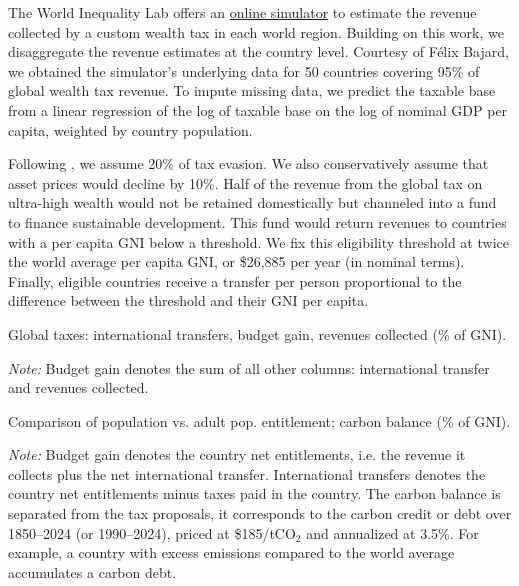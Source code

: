 \documentclass[12pt,english]{article}
\begin{document}
\begin{bibunit}
The World Inequality Lab offers an \href{https://wid.world/world-wealth-tax-simulator/}{online simulator} to estimate the revenue collected by a custom wealth tax in each world region. Building on this work, we disaggregate the revenue estimates at the country level. Courtesy of Félix Bajard, we obtained the simulator's underlying data for 50 countries covering 95\% of global wealth tax revenue. To impute missing data, we predict the taxable base from a linear regression of the log of taxable base on the log of nominal GDP per capita, weighted by country population. 

Following \cite{zucman_blueprint_2024}, we assume 20\% of tax evasion. We also conservatively assume that asset prices would decline by 10\%. Half of the revenue from the global tax on ultra-high wealth would not be retained domestically but channeled into a fund to finance sustainable development. This fund would return revenues to countries with a per capita GNI below a threshold. We fix this eligibility threshold at twice the world average per capita GNI, or \$26,885 per year (in nominal terms). Finally, eligible countries receive a transfer per person %
proportional to the difference between the threshold and their GNI per capita.

\begin{table}[!h]
  \caption{\label{tab:transfers_gain}Global taxes: international transfers, budget gain, revenues collected (\% of GNI). }
  \makebox[\textwidth][c]{
} 
{\footnotesize \textit{Note:}  Budget gain denotes the sum of all other columns: international transfer and revenues collected. %
}
\end{table}

\begin{table}[!h]
  \vspace{-1cm}
  \caption{\label{tab:transfers_balance}Comparison of population vs. adult pop. entitlement; carbon balance (\% of GNI). }
  \makebox[\textwidth][c]{
} 
{\footnotesize \textit{Note:} Budget gain denotes the country net entitlements, i.e. the revenue it collects plus the net international transfer. International transfers denotes the country net entitlements minus taxes paid in the country. The carbon balance is separated from the tax proposals, it corresponds to the carbon credit or debt over 1850--2024 (or 1990--2024), priced at \$185/tCO$_\text{2}$ and annualized at 3.5\%. For example, a country with excess emissions compared to the world average accumulates a carbon debt. %
}
\end{table}



\end{bibunit}
\end{document}
